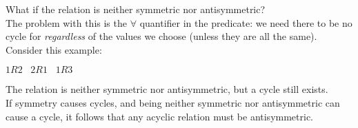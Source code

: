 \documentclass[a4paper, 12pt]{article}
\begin{document}
\begin{enumerate}
\begin{enumerate}
        \noindent What if the relation is neither symmetric nor antisymmetric? \\

        \noindent The problem with this is the $\forall$ quantifier in the predicate: we need there to be no cycle for \emph{regardless} of the values we choose (unless they are all the same). Consider this example:
        \begin{center}
            $1R2 \;\;\; 2R1 \;\;\; 1R3$
        \end{center}

        \noindent The relation is neither symmetric nor antisymmetric, but a cycle still exists. \\

        \noindent If symmetry causes cycles, and being neither symmetric nor antisymmetric can cause a cycle, it follows that any acyclic relation must be antisymmetric.
    \end{enumerate}
\end{enumerate}
\end{document}
